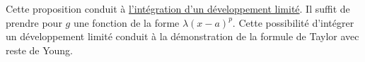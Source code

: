 \begin{rem}
 Cette proposition conduit à \href{\baseurl C5779.pdf}{l'intégration d'un développement limité}. Il suffit de prendre pour $g$ une fonction de la forme $\lambda(x-a)^p$. Cette possibilité d'intégrer un développement limité conduit à la démonstration de la formule de Taylor avec reste de Young.
\end{rem}


